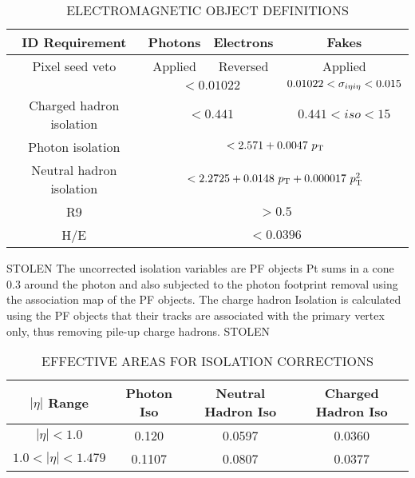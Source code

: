 \begin{table}[ht]
    \caption{ELECTROMAGNETIC OBJECT DEFINITIONS}
    \centering
    \begin{tabular}{ | c | c c c |}
        \hline
        	\hline
        \textbf{ID Requirement} & \textbf{Photons} & \textbf{Electrons} & \textbf{Fakes} \\ [0.5ex]
        \hline
        	Pixel seed veto    & \multicolumn{1}{c|}{Applied} & \multicolumn{1}{c|}{Reversed} & \multicolumn{1}{c|}{Applied}\\
	\hline
	\sigmaietaieta   & \multicolumn{2}{c|}{$ < 0.01022 $} & $0.01022 < \sigma_{i\eta i \eta}  < 0.015 $\\
	Charged hadron isolation & \multicolumn{2}{c|}{$ < 0.441$} & $ 0.441 < iso < 15$\\
	\hline
	Photon isolation & \multicolumn{3}{c|}{$ < 2.571 +0.0047~p_{\mathrm{T}}$} \\
	Neutral hadron isolation   &  \multicolumn{3}{c|}{$ < 2.2725 + 0.0148~p_{\mathrm{T}}+0.000017~p_{\mathrm{T}}^2$} \\
        R9                      & \multicolumn{3}{c|}{$ > 0.5$} \\
        H/E                     & \multicolumn{3}{c|}{$ < 0.0396$} \\
           \hline
           \hline
    \end{tabular}
    \label{tab:ID}
\end{table}

STOLEN %
The uncorrected isolation variables are PF objects 
Pt sums in a cone 0.3 around the photon and also subjected to 
the photon footprint removal using the association map of the PF objects. 
The charge hadron Isolation is calculated using the PF objects that their tracks are associated with the primary vertex only, thus removing pile-up charge hadrons.
STOLEN 

\begin{table}[ht]
    \caption{EFFECTIVE AREAS FOR ISOLATION CORRECTIONS}
    \centering
    \begin{tabular}{ | c | c c c |}
        \hline
        	\hline
        \textbf{$|\eta|$ Range} & \textbf{Photon Iso} & \textbf{Neutral Hadron Iso} & \textbf{Charged Hadron Iso} \\ [0.5ex]
        \hline
        	$|\eta| < 1.0 $                 & 0.120   &  0.0597 & 0.0360\\
	$ 1.0 < |\eta| < 1.479 $   & 0.1107 & 0.0807 & 0.0377 \\
		 \hline
           \hline
    \end{tabular}
    \label{tab:ID}
\end{table}



